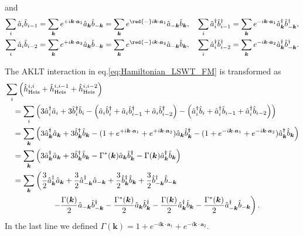 \documentclass[11pt, aps, longbibliography]{article}
\begin{document}
and 
\begin{align}
    \sum_{i}\hat{a}_i \hat{b}_{i-1} = \sum_{\bm{k}}e^{+i\bm{k}\cdot \bm{a}_1} \hat{a}_{\bm{k}} \hat{b}_{-\bm{k}} = \sum_{\bm{k}}e^{\red{-}i\bm{k}\cdot \bm{a}_1} \hat{a}_{-\bm{k}} \hat{b}_{\bm{k}}, & \quad \sum_{i}\hat{a}_i^\dagger \hat{b}_{i-1}^\dagger = \sum_{\bm{k}}e^{-i\bm{k}\cdot \bm{a}_1} \hat{a}_{\bm{k}}^\dagger \hat{b}_{-\bm{k}}^\dagger, \\
    \sum_{i}\hat{a}_i \hat{b}_{i-2} = \sum_{\bm{k}}e^{+i\bm{k}\cdot \bm{a}_2} \hat{a}_{\bm{k}} \hat{b}_{-\bm{k}} = \sum_{\bm{k}}e^{\red{-}i\bm{k}\cdot \bm{a}_2} \hat{a}_{-\bm{k}} \hat{b}_{\bm{k}}, & \quad \sum_{i}\hat{a}_i^\dagger \hat{b}_{i-2}^\dagger = \sum_{\bm{k}}e^{-i\bm{k}\cdot \bm{a}_2} \hat{a}_{\bm{k}}^\dagger \hat{b}_{-\bm{k}}^\dagger.
\end{align}

The AKLT interaction in eq.\eqref{eq:Hamiltonian_LSWT_FM} is transformed as
\begin{align}
    &\sum_{i}\left( \hat{h}_{\rm Heis}^{i,i} + \hat{h}_{\rm Heis}^{i,i-1} + \hat{h}_{\rm Heis}^{i,i-2} \right) \notag  \\
    & \quad = \sum_{i} \left( 3\hat{a}^\dagger_i \hat{a}_i + 3\hat{b}^\dagger_i \hat{b}_i - \left( \hat{a}_i \hat{b}^{\dagger}_i + \hat{a}_i \hat{b}^{\dagger}_{i-1} + \hat{a}_i \hat{b}^{\dagger}_{i-2}\right) - \left( \hat{a}^\dagger_i \hat{b}_i + \hat{a}^\dagger_i \hat{b}_{i-1} + \hat{a}^\dagger_i \hat{b}_{i-2} \right) \right) \notag \\
    & \quad = \sum_{\bm{k}} \left( 3\hat{a}_{\bm{k}}^\dagger\hat{a}_{\bm{k}} + 3\hat{b}_{\bm{k}}^\dagger\hat{b}_{\bm{k}} - (1+e^{+i\bm{k}\cdot \bm{a}_1}+e^{+i\bm{k}\cdot \bm{a}_2}) \hat{a}_{\bm{k}} \hat{b}_{\bm{k}}^\dagger  - (1+e^{-i\bm{k}\cdot \bm{a}_1}+e^{-i\bm{k}\cdot \bm{a}_2}) \hat{a}_{\bm{k}}^\dagger  \hat{b}_{\bm{k}}\right) \notag \\
    & \quad = \sum_{\bm{k}} \left( 3\hat{a}_{\bm{k}}^\dagger\hat{a}_{\bm{k}} + 3\hat{b}_{\bm{k}}^\dagger\hat{b}_{\bm{k}} - \Gamma^*(\bm{k}) \hat{a}_{\bm{k}} \hat{b}_{\bm{k}}^\dagger  - \Gamma(\bm{k}) \hat{a}_{\bm{k}}^\dagger  \hat{b}_{\bm{k}}\right) \notag \\
    & \quad = \sum_{\bm{k}} \left( \frac{3}{2}\hat{a}_{\bm{k}}^\dagger\hat{a}_{\bm{k}} + \frac{3}{2}\hat{a}_{-\bm{k}}^\dagger\hat{a}_{-\bm{k}} + \frac{3}{2}\hat{b}_{\bm{k}}^\dagger\hat{b}_{\bm{k}} + \frac{3}{2}\hat{b}_{-\bm{k}}^\dagger\hat{b}_{-\bm{k}} \right.  \notag \\
    & \quad \quad \quad \quad \quad \quad \left. - \frac{\Gamma(\bm{k})}{2} \hat{a}_{-\bm{k}} \hat{b}_{-\bm{k}}^\dagger - \frac{\Gamma^*(\bm{k})}{2} \hat{a}_{\bm{k}} \hat{b}_{\bm{k}}^\dagger  - \frac{\Gamma(\bm{k})}{2} \hat{a}_{\bm{k}}^\dagger  \hat{b}_{\bm{k}} - \frac{\Gamma^*(\bm{k})}{2} \hat{a}_{-\bm{k}}^\dagger  \hat{b}_{-\bm{k}}\right).
\end{align}
In the last line we defined $\Gamma(\bm{k}) = 1+e^{-i\bm{k}\cdot \bm{a}_1}+e^{-i\bm{k}\cdot \bm{a}_2}$.
\end{document}
